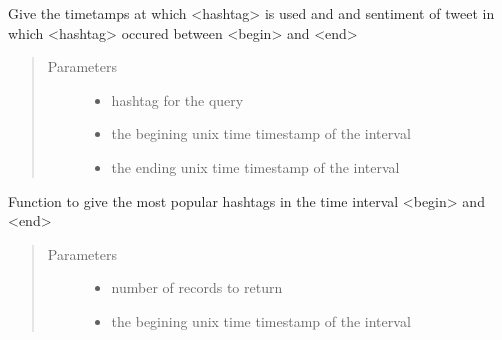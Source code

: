 \documentclass[letterpaper,10pt,english]{sphinxmanual}
\begin{document}
\begin{fulllineitems}
\begin{fulllineitems}
\label{\detokenize{mongoDB_query_generation:execute_queries.MongoQuery.ht_with_sentiment}}
Give the timetamps at which \textless{}hashtag\textgreater{} is used and and sentiment of tweet in which \textless{}hashtag\textgreater{} occured between \textless{}begin\textgreater{} and \textless{}end\textgreater{}
\begin{quote}\begin{description}
\item[{Parameters}] \leavevmode\begin{itemize}
\item {} 
 \textendash{} hashtag for the query

\item {} 
 \textendash{} the begining unix time timestamp of the interval

\item {} 
 \textendash{} the ending unix time timestamp of the interval

\end{itemize}

\end{description}\end{quote}

\end{fulllineitems}


\begin{fulllineitems}
\label{\detokenize{mongoDB_query_generation:execute_queries.MongoQuery.mp_ht_in_interval}}
Function to give the most popular hashtags in the time interval \textless{}begin\textgreater{} and \textless{}end\textgreater{}
\begin{quote}\begin{description}
\item[{Parameters}] \leavevmode\begin{itemize}
\item {} 
 \textendash{} number of records to return

\item {} 
 \textendash{} the begining unix time timestamp of the interval


\end{itemize}
\end{description}
\end{quote}
\end{fulllineitems}
\end{fulllineitems}
\end{document}
